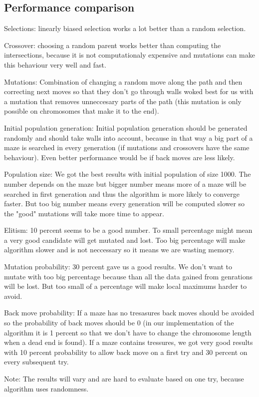 \documentclass[12pt]{article} %
\begin{document}
\subsection{Performance comparison}
Selections: linearly biased selection works a lot better than a random selection.

Crossover: choosing a random parent works better than computing the intersections, because it is not computationaly expensive and mutations
can make this behaviour very well and fast.

Mutations: Combination of changing a random move along the path and then correcting next moves so that they don't go through walls woked best for us
with a mutation that removes unneccesary parts of the path (this mutation is only possible on chromosomes that make it to the end).

Initial population generation: Initial population generation should be generated randomly and should take walls into account, because in that way a big part
of a maze is searched in every generation (if mutations and crossovers have the same behaviour). Even better performance would be if back moves are less
likely.

Population size: We got the best results with initial population of size 1000. The number depends on the maze but bigger number means more of a maze will
be searched in first generation and thus the algorithm is more likely to converge faster. But too big number means every generation will be computed slower
so the "good" mutations will take more time to appear.

Elitism: 10 percent seems to be a good number. To small percentage might mean a very good candidate will get mutated and lost. Too big percentage will 
make algorithm slower and is not neccessary so it means we are wasting memory.

Mutation probability: 30 percent gave us a good results. We don't want to mutate with too big percentage because than all the data gained from genrations
will be lost. But too small of a percentage will make local maximums harder to avoid.

Back move probability: If a maze has no tresasures back moves should be avoided so the probability of back moves should be 0 (in our implementation
of the algorithm it is 1 percent so that we don't have to change the chromosome length when a dead end is found). If a maze contains tressures, we got very
good results with 10 percent probability to allow back move on a first try and 30 percent on every subsequent try.

Note: The results will vary and are hard to evaluate based on one try, because algorithm uses randomness.
\end{document}
